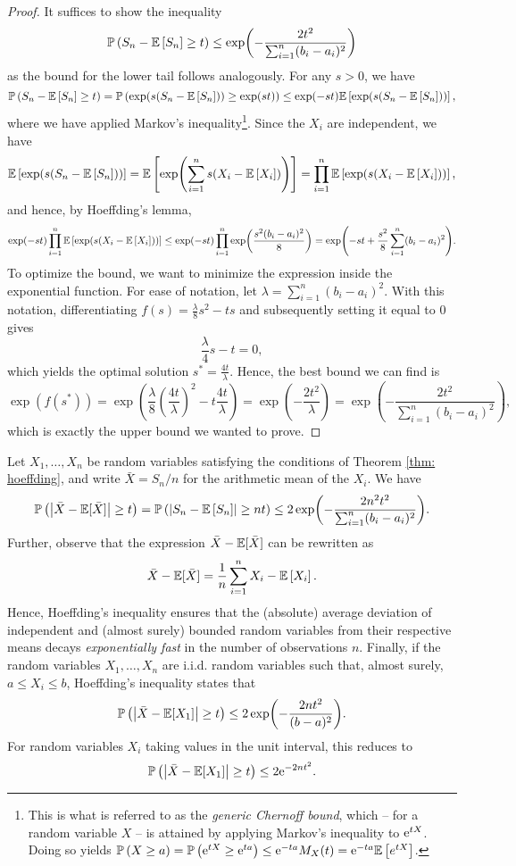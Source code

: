 \begin{proof}
It suffices to show the inequality
\[
    \mathbb{P}\left(S_n - \mathbb{E}\left[S_n\right] \geq t\right) \leq \exp(-\frac{2t^2}{\sum_{i=1}^n (b_i - a_i)^2})
\]
as the bound for the lower tail follows analogously. For any $s>0$, we have
\[
    \mathbb{P}\left(S_n - \mathbb{E}\left[S_n\right] \geq t\right) = \mathbb{P}\left(\exp(s(S_n - \mathbb{E}\left[S_n\right])) \geq \exp(st)\right) \leq \exp(-st) \mathbb{E}\left[\exp(s(S_n - \mathbb{E}\left[S_n\right]))\right],
\]
where we have applied Markov's inequality\footnote{This is what is referred to as the \emph{generic Chernoff bound}, which -- for a random variable $X$ -- is attained by applying Markov's inequality to $\mathrm{e}^{tX}$. Doing so yields $\mathbb{P}\left(X \geq a\right) = \mathbb{P}\left(\mathrm{e}^{tX} \geq \mathrm{e}^{ta}\right) \leq \mathrm{e}^{-ta} M_X(t) = \mathrm{e}^{-ta} \mathbb{E}\left[e^{tX}\right]$.}. Since the $X_i$ are independent, we have
\[
    \mathbb{E}\left[\exp(s(S_n - \mathbb{E}\left[S_n\right]))\right] = \mathbb{E}\left[\exp(\sum_{i=1}^n s(X_i - \mathbb{E}\left[X_i\right]))\right] = \prod_{i=1}^n \mathbb{E}\left[\exp(s(X_i - \mathbb{E}\left[X_i\right]))\right],
\]
and hence, by Hoeffding's lemma,
\[
    \exp(-st) \prod_{i=1}^n \mathbb{E}\left[\exp(s(X_i - \mathbb{E}\left[X_i\right]))\right] \leq \exp(-st) \prod_{i=1}^n \exp(\frac{s^2 (b_i-a_i)^2}{8}) = \exp(-st + \frac{s^2}{8} \sum_{i=1}^n (b_i-a_i)^2).
\]
To optimize the bound, we want to minimize the expression inside the exponential function. For ease of notation, let $\lambda = \sum_{i=1}^n (b_i-a_i)^2$. With this notation, differentiating $f(s) = \frac{\lambda}{8} s^2 -ts$ and subsequently setting it equal to $0$ gives
\[
    \frac{\lambda}{4} s - t = 0,
\]
which yields the optimal solution $s^* = \frac{4t}{\lambda}$. Hence, the best bound we can find is
\[
    \exp(f(s^*)) = \exp(\frac{\lambda}{8} \left(\frac{4t}{\lambda}\right)^2 - t \frac{4t}{\lambda}) = \exp(-\frac{2t^2}{\lambda}) = \exp(-\frac{2t^2}{\sum_{i=1}^n (b_i - a_i)^2}),
\]
which is exactly the upper bound we wanted to prove.
\end{proof}

\begin{remark}
Let $X_1, \dots, X_n$ be random variables satisfying the conditions of Theorem \ref{thm: hoeffding}, and write $\bar X = S_n/n$ for the arithmetic mean of the $X_i$. We have
\[
    \mathbb{P}\left(\abs{\bar X - \mathbb{E}[\bar X]} \geq t\right) = \mathbb{P}\left(\abs{S_n - \mathbb{E}\left[S_n\right]} \geq nt\right) \leq 2 \exp(-\frac{2n^2t^2}{\sum_{i=1}^n (b_i - a_i)^2}).
\]
Further, observe that the expression $\bar X - \mathbb{E}[\bar X]$ can be rewritten as
\[
    \bar X - \mathbb{E}[\bar X] = \frac{1}{n} \sum_{i=1}^n X_i - \mathbb{E}\left[X_i\right].
\]
Hence, Hoeffding's inequality ensures that the (absolute) average deviation of independent and (almost surely) bounded random variables from their respective means decays \emph{exponentially fast} in the number of observations $n$. Finally, if the random variables $X_1, \dots, X_n$ are i.i.d. random variables such that, almost surely, $a \leq X_i \leq b$, Hoeffding's inequality states that
\[
    \mathbb{P}\left(\abs{\bar X - \mathbb{E}[X_1]} \geq t\right) \leq 2 \exp(-\frac{2nt^2}{(b - a)^2}).
\]
For random variables $X_i$ taking values in the unit interval, this reduces to
\[
    \mathbb{P}\left(\abs{\bar X - \mathbb{E}[X_1]} \geq t\right) \leq 2 \mathrm{e}^{-2nt^2}.
\]
\end{remark}
